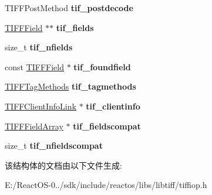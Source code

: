 \begin{DoxyCompactItemize}
\item 
\mbox{\label{structtiff_a68256081a61aba786919d3294e464fc5}} 
T\+I\+F\+F\+Post\+Method {\bfseries tif\+\_\+postdecode}
\item 
\mbox{\label{structtiff_a60f4e669baf216684ed9a892197c5b11}} 
\hyperlink{struct___t_i_f_f_field}{T\+I\+F\+F\+Field} $\ast$$\ast$ {\bfseries tif\+\_\+fields}
\item 
\mbox{\label{structtiff_a5160f0d0220f4eeb288a75670d5f7d5b}} 
size\+\_\+t {\bfseries tif\+\_\+nfields}
\item 
\mbox{\label{structtiff_a0a96599d2db9aa8581993d9f200d224d}} 
const \hyperlink{struct___t_i_f_f_field}{T\+I\+F\+F\+Field} $\ast$ {\bfseries tif\+\_\+foundfield}
\item 
\mbox{\label{structtiff_a2c44dd87e4920023a7372bd6d220f3cc}} 
\hyperlink{struct_t_i_f_f_tag_methods}{T\+I\+F\+F\+Tag\+Methods} {\bfseries tif\+\_\+tagmethods}
\item 
\mbox{\label{structtiff_a6088fcaae4547b6714ccd0eda74cf39a}} 
\hyperlink{structclient__info}{T\+I\+F\+F\+Client\+Info\+Link} $\ast$ {\bfseries tif\+\_\+clientinfo}
\item 
\mbox{\label{structtiff_af4ad06d391680f3890e67ec45001e5c5}} 
\hyperlink{struct___t_i_f_f_field_array}{T\+I\+F\+F\+Field\+Array} $\ast$ {\bfseries tif\+\_\+fieldscompat}
\item 
\mbox{\label{structtiff_ad68a7100ccc6c4f2d4228e1a3775651d}} 
size\+\_\+t {\bfseries tif\+\_\+nfieldscompat}
\end{DoxyCompactItemize}


该结构体的文档由以下文件生成\+:\begin{DoxyCompactItemize}
\item 
E\+:/\+React\+O\+S-\/0../sdk/include/reactos/libs/libtiff/tiffiop.\+h\end{DoxyCompactItemize}

